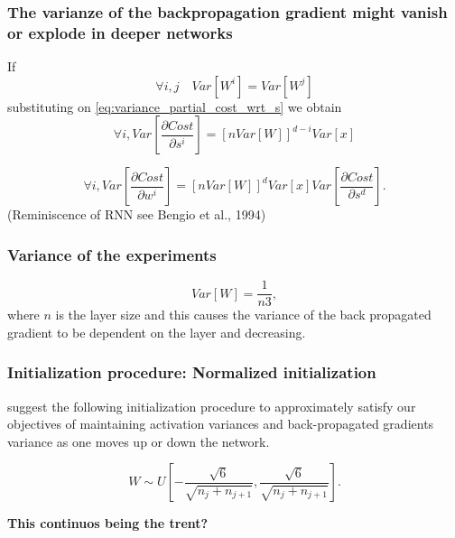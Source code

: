 \begin{frame}
  \frametitle{The varianze of the backpropagation gradient might vanish or explode in deeper networks}

If 
\begin{equation}
  \forall i, j \quad Var\left[W^i\right] = Var\left[W^j\right]
\end{equation}
substituting on \ref{eq:variance_partial_cost_wrt_s}
we obtain 
\begin{equation}
  \forall i,
Var\left[
  \frac{\partial Cost}{ \partial s^i}
\right]
= 
\left[
  n Var[W]
\right]^{d-i}
Var[x]
\end{equation}


\begin{equation}
  \forall i, 
  Var\left[
  \frac{\partial Cost}{ \partial w^i}
\right]
= 
\left[
  n Var[W]
\right]^{d}
Var[x]
Var\left[
  \frac{\partial Cost}{ \partial s^d}
\right].
\end{equation}
(Reminiscence of RNN see Bengio et al., 1994)

\end{frame}

\begin{frame}
  \frametitle{Variance of the experiments}

  \begin{equation}
    Var[W] = \frac{1}{n3},
  \end{equation}
  where $n$ is the layer size 
  and this causes the variance of the back propagated gradient
  to be dependent on the layer and decreasing. 

\end{frame}

\begin{frame}
  \frametitle{Initialization procedure: Normalized initialization}

  suggest the following initialization procedure to approximately satisfy our 
  objectives of maintaining activation 
  variances and back-propagated gradients 
  variance as one moves up or down the 
  network.

  \begin{equation}
    W \sim 
    U \left[
      - \frac{\sqrt{6}}{\sqrt{n_j + n_{j+1}}}
      ,
      \frac{\sqrt{6}}{\sqrt{n_j + n_{j+1}}}
    \right].
  \end{equation}

  \textbf{This continuos being the trent?}

\end{frame}

